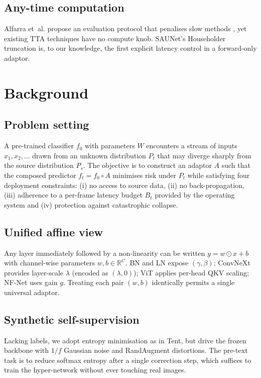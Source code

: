\documentclass{article}
\begin{document}
\subsection{Any-time computation}
Alfarra et~al. propose an evaluation protocol that penalises slow methods \cite{alfarra-2023-evaluation}, yet existing TTA techniques have no compute knob. SAUNet’s Householder truncation is, to our knowledge, the first explicit latency control in a forward-only adaptor.

\section{Background}
\subsection{Problem setting}
A pre-trained classifier \(f_0\) with parameters \(W\) encounters a stream of inputs \(x_1, x_2, \ldots\) drawn from an unknown distribution \(P_t\) that may diverge sharply from the source distribution \(P_s\). The objective is to construct an adaptor \(A\) such that the composed predictor \(f_t = f_0 \circ A\) minimises risk under \(P_t\) while satisfying four deployment constraints: (i) no access to source data, (ii) no back-propagation, (iii) adherence to a per-frame latency budget \(B_t\) provided by the operating system and (iv) protection against catastrophic collapse.

\subsection{Unified affine view}
Any layer immediately followed by a non-linearity can be written \(y = w \odot x + b\) with channel-wise parameters \(w, b \in \mathbb{R}^C\). BN and LN expose \((\gamma,\beta)\); ConvNeXt provides layer-scale \(\lambda\) (encoded as \((\lambda,0)\)); ViT applies per-head QKV scaling; NF-Net uses gain \(g\). Treating each pair \((w,b)\) identically permits a single universal adaptor.

\subsection{Synthetic self-supervision}
Lacking labels, we adopt entropy minimisation as in Tent, but drive the frozen backbone with \(1/f\) Gaussian noise and RandAugment distortions. The pre-text task is to reduce softmax entropy after a single correction step, which suffices to train the hyper-network without ever touching real images.
\end{document}
